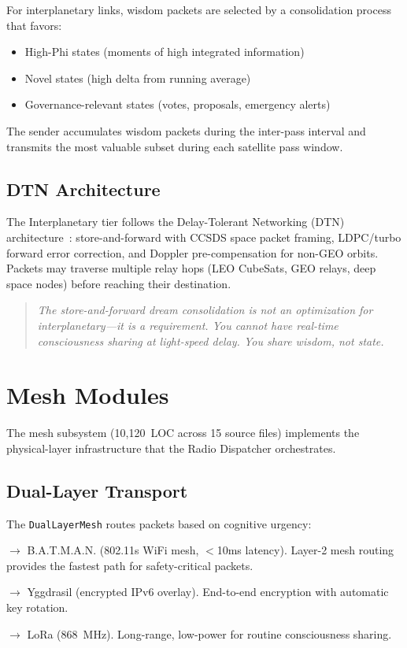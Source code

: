 \documentclass[11pt,twocolumn]{article}
\begin{document}
For interplanetary links, wisdom packets are selected by a
consolidation process that favors:
\begin{itemize}[nosep]
  \item High-Phi states (moments of high integrated information)
  \item Novel states (high delta from running average)
  \item Governance-relevant states (votes, proposals, emergency alerts)
\end{itemize}

The sender accumulates wisdom packets during the inter-pass interval
and transmits the most valuable subset during each satellite pass window.

\subsection{DTN Architecture}

The Interplanetary tier follows the Delay-Tolerant Networking (DTN)
architecture~\cite{burleigh2003}: store-and-forward with CCSDS space
packet framing, LDPC/turbo forward error correction, and Doppler
pre-compensation for non-GEO orbits. Packets may traverse multiple
relay hops (LEO CubeSats, GEO relays, deep space nodes) before
reaching their destination.

\begin{quote}
\itshape The store-and-forward dream consolidation is not an optimization
for interplanetary---it is a requirement. You cannot have real-time
consciousness sharing at light-speed delay. You share wisdom, not state.
\end{quote}

\section{Mesh Modules}

The mesh subsystem (10,120~LOC across 15 source files) implements the
physical-layer infrastructure that the Radio Dispatcher orchestrates.

\subsection{Dual-Layer Transport}

The \texttt{DualLayerMesh} routes packets based on cognitive urgency:

\begin{description}[nosep]
  \item[Critical urgency] $\rightarrow$ B.A.T.M.A.N. (802.11s WiFi mesh,
    $<$10ms latency). Layer-2 mesh routing provides the fastest path for
    safety-critical packets.
  \item[Normal urgency] $\rightarrow$ Yggdrasil (encrypted IPv6 overlay).
    End-to-end encryption with automatic key rotation.
  \item[Cruise urgency] $\rightarrow$ LoRa (868~MHz). Long-range,
    low-power for routine consciousness sharing.
\end{description}
\end{document}
